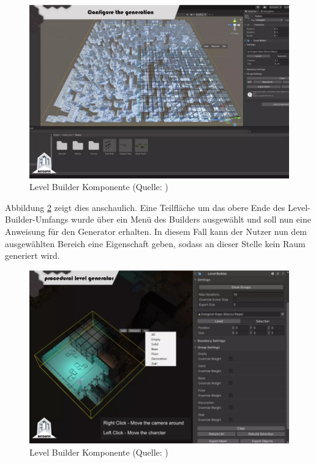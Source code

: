 \begin{figure}[ht]
\centering
\includegraphics[width=1\linewidth]{content/pictures/FirstSteps00.png}
\caption{Level Builder Komponente (Quelle: \cite{alasl_autolevel_nodate})}
\label{fig:level_builder}
\end{figure}

Abbildung \ref{fig:level_builder_edit} zeigt dies anschaulich. Eine Teilfläche um das obere Ende des Level-Builder-Umfangs wurde über ein Menü des Builders ausgewählt und soll nun eine Anweisung für den Generator erhalten. In diesem Fall kann der Nutzer nun dem ausgewählten Bereich eine Eigenschaft geben, sodass an dieser Stelle kein Raum generiert wird.

\begin{figure}[ht]
\centering
\includegraphics[width=1\linewidth]{content/pictures/FirstSteps01.png}
\caption{Level Builder Komponente (Quelle: \cite{alasl_autolevel_nodate})}
\label{fig:level_builder_edit}
\end{figure}

